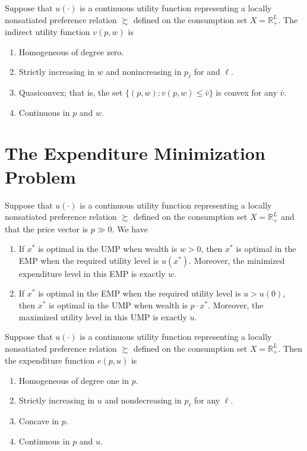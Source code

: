 \begin{prop}
    Suppose that $u(\cdot)$ is a continuous utility function representing a locally nonsatiated preference relation $\succsim$ defined on the consumption set $X = \mathbb{R}^L_+$. The indirect utility function $v(p, w)$ is
    \begin{enumerate}
        \item Homogeneous of degree zero.
        \item Strictly increasing in $w$ and nonincreasing in $p_\ell$ for and $\ell$.
        \item Quasiconvex; that is, the set $\{(p, w): v(p, w) \leq \bar{v}\}$ is convex for any $\bar{v}$.
        \item Continuous in $p$ and $w$.
    \end{enumerate}
\end{prop}


\section{The Expenditure Minimization Problem}

\begin{prop}
    Suppose that $u(\cdot)$ is a continuous utility function representing a locally nonsatiated preference relation $\succsim$ defined on the consumption set $X = \mathbb{R}^L_+$ and that the price vector is $p \gg 0$. We have
    \begin{enumerate}
        \item If $x^*$ is optimal in the UMP when wealth is $w > 0$, then $x^*$ is optimal in the EMP when the required utility level is $u(x^*)$. Moreover, the minimized expenditure level in this EMP is exactly $w$.
        \item If $x^*$ is optimal in the EMP when the required utility level is $u > u(0)$, then $x^*$ is optimal in the UMP when wealth is $p \cdot x^*$. Moreover, the maximized utility level in this UMP is exactly $u$.
    \end{enumerate}
\end{prop}

\begin{prop}
    Suppose that $u(\cdot)$ is a continuous utility function representing a locally nonsatiated preference relation $\succsim$ defined on the consumption set $X = \mathbb{R}^L_+$. Then the expenditure function $e(p, u)$ is 
    \begin{enumerate}
        \item Homogeneous of degree one in $p$.
        \item Strictly increasing in $u$ and nondecreasing in $p_\ell$ for any $\ell$.
        \item Concave in $p$.
        \item Continuous in $p$ and $u$.
    \end{enumerate}
\end{prop}

